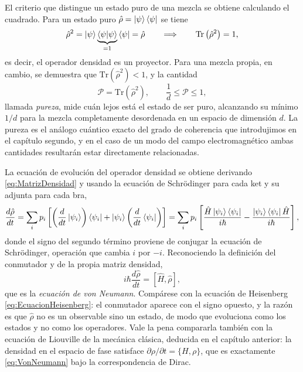         El criterio que distingue un estado puro de una mezcla se obtiene calculando el cuadrado. Para un estado puro $\hat{\rho} = \ket{\psi}\bra{\psi}$ se tiene
        \begin{equation}\label{eq:RhoPuro}
            \hat{\rho}^{2} = \ket{\psi}\underbrace{\braket{\psi|\psi}}_{=1}\bra{\psi} = \hat{\rho}
            \qquad\Longrightarrow\qquad
            \mathrm{Tr}\left(\hat{\rho}^{2}\right) = 1,
        \end{equation}
        es decir, el operador densidad es un proyector. Para una mezcla propia, en cambio, se demuestra que $\mathrm{Tr}(\hat{\rho}^{2}) < 1$, y la cantidad
        \begin{equation}\label{eq:Pureza}
            \mathcal{P} = \mathrm{Tr}\left(\hat{\rho}^{2}\right),
            \qquad
            \frac{1}{d}\leq\mathcal{P}\leq 1,
        \end{equation}
        llamada \textit{pureza}, mide cuán lejos está el estado de ser puro, alcanzando su mínimo $1/d$ para la mezcla completamente desordenada en un espacio de dimensión $d$. La pureza es el análogo cuántico exacto del grado de coherencia que introdujimos en el capítulo segundo, y en el caso de un modo del campo electromagnético ambas cantidades resultarán estar directamente relacionadas.

        La ecuación de evolución del operador densidad se obtiene derivando \eqref{eq:MatrizDensidad} y usando la ecuación de Schrödinger para cada ket y su adjunta para cada bra,
        \begin{equation}\label{eq:DerivadaRho}
            \frac{d\hat{\rho}}{dt} = \sum_{i}p_{i}\left[\left(\frac{d}{dt}\ket{\psi_{i}}\right)\bra{\psi_{i}} + \ket{\psi_{i}}\left(\frac{d}{dt}\bra{\psi_{i}}\right)\right]
            = \sum_{i}p_{i}\left[\frac{\hat{H}\ket{\psi_{i}}\bra{\psi_{i}}}{i\hbar} - \frac{\ket{\psi_{i}}\bra{\psi_{i}}\hat{H}}{i\hbar}\right],
        \end{equation}
        donde el signo del segundo término proviene de conjugar la ecuación de Schrödinger, operación que cambia $i$ por $-i$. Reconociendo la definición del conmutador y de la propia matriz densidad,
        \begin{equation}\label{eq:VonNeumann}
            \boxed{\;i\hbar\frac{d\hat{\rho}}{dt} = \left[\hat{H},\hat{\rho}\right],\;}
        \end{equation}
        que es la \textit{ecuación de von Neumann}. Compárese con la ecuación de Heisenberg \eqref{eq:EcuacionHeisenberg}: el conmutador aparece con el signo opuesto, y la razón es que $\hat{\rho}$ no es un observable sino un estado, de modo que evoluciona como los estados y no como los operadores. Vale la pena compararla también con la ecuación de Liouville de la mecánica clásica, deducida en el capítulo anterior: la densidad en el espacio de fase satisface $\partial\rho/\partial t = \{H,\rho\}$, que es exactamente \eqref{eq:VonNeumann} bajo la correspondencia de Dirac.

